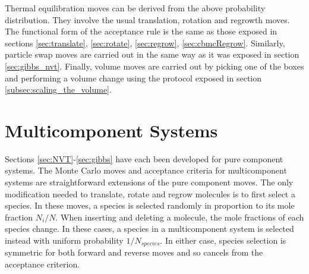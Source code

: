 Thermal equilibration moves can be derived from the above probability distribution. They involve
the usual translation, rotation and regrowth moves. The functional form of the acceptance rule
is the same as those exposed in 
sections \ref{sec:translate}, \ref{sec:rotate}, \ref{sec:regrow}, \ref{sec:cbmcRegrow}.
Similarly, particle swap moves are carried out in the same way as it was exposed in section \ref{sec:gibbs_nvt}. 
Finally, volume moves are carried out by picking one of the boxes and performing a volume change using the protocol
exposed in section \ref{subsec:scaling_the_volume}. 





\section{Multicomponent Systems} 

Sections \ref{sec:NVT}-\ref{sec:gibbs} have each been developed for pure component systems. The Monte Carlo moves and acceptance criteria for multicomponent systems are straightforward extensions of the pure component moves. The only modification needed to translate, rotate and regrow molecules is to first select a species. In these moves, a species is selected randomly in proportion to its mole fraction $N_i/N$. When inserting and deleting a molecule, the mole fractions of each species change. In these cases, a species in a multicomponent system is selected instead with uniform probability $1/N_{species}$. In either case, species selection is symmetric for both forward and reverse moves and so cancels from the acceptance criterion.

